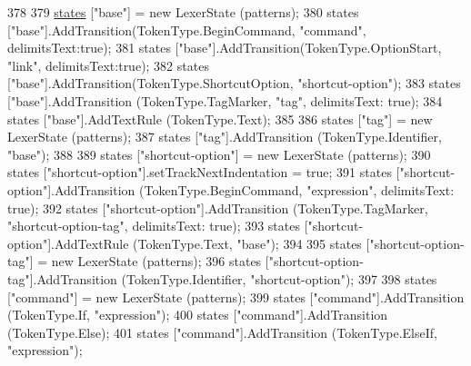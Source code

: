 \begin{DoxyCode}
{378 
379             \hyperlink{a00127_a2c65c0ba90f973e459583badefef216a}{states} [\textcolor{stringliteral}{"base"}] = \textcolor{keyword}{new} LexerState (patterns);
380             states [\textcolor{stringliteral}{"base"}].AddTransition(TokenType.BeginCommand, \textcolor{stringliteral}{"command"}, delimitsText:\textcolor{keyword}{true});
381             states [\textcolor{stringliteral}{"base"}].AddTransition(TokenType.OptionStart, \textcolor{stringliteral}{"link"}, delimitsText:\textcolor{keyword}{true});
382             states [\textcolor{stringliteral}{"base"}].AddTransition(TokenType.ShortcutOption, \textcolor{stringliteral}{"shortcut-option"});
383             states [\textcolor{stringliteral}{"base"}].AddTransition (TokenType.TagMarker, \textcolor{stringliteral}{"tag"}, delimitsText: \textcolor{keyword}{true});
384             states [\textcolor{stringliteral}{"base"}].AddTextRule (TokenType.Text);
385 
386             states [\textcolor{stringliteral}{"tag"}] = \textcolor{keyword}{new} LexerState (patterns);
387             states [\textcolor{stringliteral}{"tag"}].AddTransition (TokenType.Identifier, \textcolor{stringliteral}{"base"});
388 
389             states [\textcolor{stringliteral}{"shortcut-option"}] = \textcolor{keyword}{new} LexerState (patterns);
390             states [\textcolor{stringliteral}{"shortcut-option"}].setTrackNextIndentation = \textcolor{keyword}{true};
391             states [\textcolor{stringliteral}{"shortcut-option"}].AddTransition (TokenType.BeginCommand, \textcolor{stringliteral}{"expression"}, delimitsText: \textcolor{keyword}{
      true});
392             states [\textcolor{stringliteral}{"shortcut-option"}].AddTransition (TokenType.TagMarker, \textcolor{stringliteral}{"shortcut-option-tag"}, 
      delimitsText: \textcolor{keyword}{true});
393             states [\textcolor{stringliteral}{"shortcut-option"}].AddTextRule (TokenType.Text, \textcolor{stringliteral}{"base"});
394 
395             states [\textcolor{stringliteral}{"shortcut-option-tag"}] = \textcolor{keyword}{new} LexerState (patterns);
396             states [\textcolor{stringliteral}{"shortcut-option-tag"}].AddTransition (TokenType.Identifier, \textcolor{stringliteral}{"shortcut-option"});
397 
398             states [\textcolor{stringliteral}{"command"}] = \textcolor{keyword}{new} LexerState (patterns);
399             states [\textcolor{stringliteral}{"command"}].AddTransition (TokenType.If, \textcolor{stringliteral}{"expression"});
400             states [\textcolor{stringliteral}{"command"}].AddTransition (TokenType.Else);
401             states [\textcolor{stringliteral}{"command"}].AddTransition (TokenType.ElseIf, \textcolor{stringliteral}{"expression"});
}
\end{DoxyCode}
